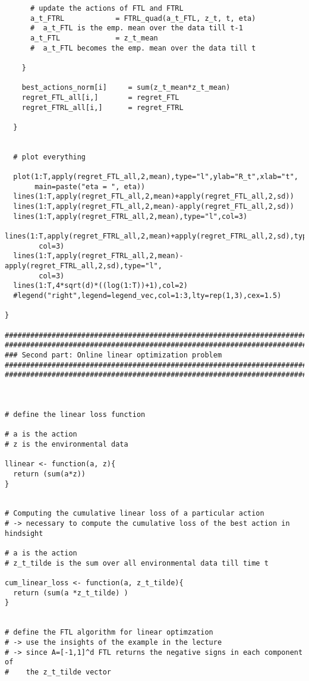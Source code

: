 \documentclass[a4paper]{article}
\begin{document}
{\begin{lstlisting}
      # update the actions of FTL and FTRL        
      a_t_FTRL            = FTRL_quad(a_t_FTL, z_t, t, eta) 
      #  a_t_FTL is the emp. mean over the data till t-1
      a_t_FTL             = z_t_mean 
      #  a_t_FTL becomes the emp. mean over the data till t
      
    }
    
    best_actions_norm[i]     = sum(z_t_mean*z_t_mean)
    regret_FTL_all[i,]       = regret_FTL
    regret_FTRL_all[i,]      = regret_FTRL
    
  }
  
  
  # plot everything 
  
  plot(1:T,apply(regret_FTL_all,2,mean),type="l",ylab="R_t",xlab="t",
       main=paste("eta = ", eta))
  lines(1:T,apply(regret_FTL_all,2,mean)+apply(regret_FTL_all,2,sd))
  lines(1:T,apply(regret_FTL_all,2,mean)-apply(regret_FTL_all,2,sd))
  lines(1:T,apply(regret_FTRL_all,2,mean),type="l",col=3)
  lines(1:T,apply(regret_FTRL_all,2,mean)+apply(regret_FTRL_all,2,sd),type="l",
        col=3)
  lines(1:T,apply(regret_FTRL_all,2,mean)-apply(regret_FTRL_all,2,sd),type="l",
        col=3)
  lines(1:T,4*sqrt(d)*((log(1:T))+1),col=2)
  #legend("right",legend=legend_vec,col=1:3,lty=rep(1,3),cex=1.5)

}

###############################################################################
###############################################################################
### Second part: Online linear optimization problem
###############################################################################
###############################################################################



# define the linear loss function

# a is the action
# z is the environmental data

llinear <- function(a, z){
  return (sum(a*z))
}


# Computing the cumulative linear loss of a particular action 
# -> necessary to compute the cumulative loss of the best action in hindsight

# a is the action
# z_t_tilde is the sum over all environmental data till time t

cum_linear_loss <- function(a, z_t_tilde){
  return (sum(a *z_t_tilde) )
}


# define the FTL algorithm for linear optimzation
# -> use the insights of the example in the lecture
# -> since A=[-1,1]^d FTL returns the negative signs in each component of 
#    the z_t_tilde vector


\end{lstlisting}}
\end{document}
